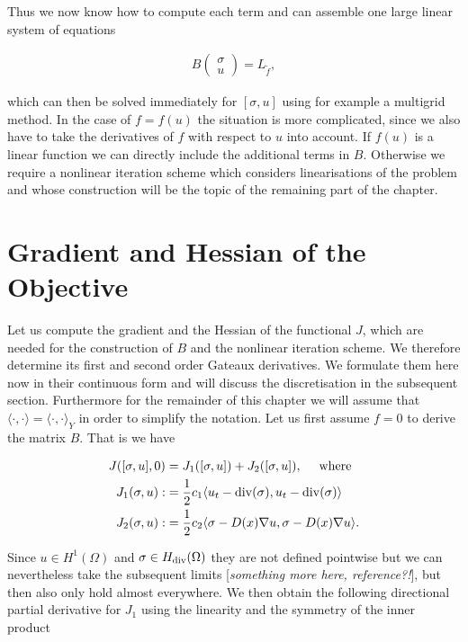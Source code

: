 \documentclass[../draft_1.tex]{subfiles}
\begin{document}
Thus we now know how to compute each term and can assemble one large linear system of equations
\begin{ceqn}
	\begin{align}
B
\begin{pmatrix}
\sigma \\
u
\end{pmatrix} = L_{\tilde{f}},
	\end{align}
\end{ceqn}
which can then be solved immediately for $[\sigma, u]$ using for example a multigrid method. In the case of $f = f(u)$ the situation is more complicated, since we also have to take the derivatives of $f$ with respect to $u$ into account. If $f(u)$ is a linear function we can directly include the additional terms in $B$. Otherwise we require a nonlinear iteration scheme which considers linearisations of the problem and whose construction will be the topic of the remaining part of the chapter. 

\section{Gradient and Hessian of the Objective}
Let us compute the gradient and the Hessian of the functional $J$, which are needed for the construction of $B$ and the nonlinear iteration scheme. We therefore determine its first and second order Gateaux derivatives. We formulate them here now in their continuous form and will discuss the discretisation in the subsequent section. Furthermore for the remainder of this chapter we will assume that $\langle \cdot, \cdot \rangle = \langle \cdot, \cdot \rangle _Y$ in order to simplify the notation. Let us first assume $f = 0$ to derive the matrix $B$. That is we have 

\begin{equation}
\begin{aligned}
J([\sigma, u], 0)& = J_1([\sigma, u]) + J_2([\sigma, u]), \quad \text{ where } \\
J_1(\sigma, u) : &= \frac{1}{2}c_1\langle u_t - \mathop{}\!\mathrm{div}(\sigma), u_t - \mathop{}\!\mathrm{div}(\sigma) \rangle \\
J_2(\sigma, u) :&= \frac{1}{2} c_2\langle \sigma - D(x) \nabla u, \sigma  - D(x) \nabla u \rangle.
\end{aligned}
\end{equation}

Since $u \in H^1(\Omega)$ and $\sigma \in H_{\mathop{}\!\mathrm{div}}(\Omega)$ they are not defined pointwise but we can nevertheless take the subsequent limits [\textit{something more here, reference?!}], but then also only hold almost everywhere. We then obtain the following directional partial derivative for $J_1$ using the linearity and the symmetry of the inner product
\end{document}
